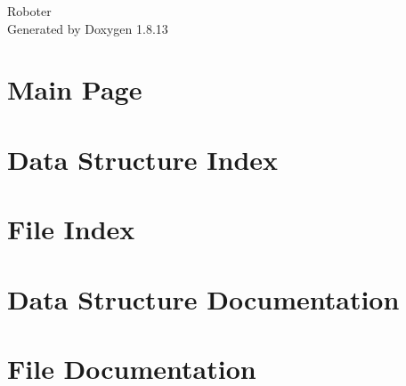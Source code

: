 \documentclass[twoside]{book}
\newcommand{\+}{\discretionary{\mbox{\scriptsize$\hookleftarrow$}}{}{}}
\newcommand{\clearemptydoublepage}{%
  \newpage{\pagestyle{empty}\cleardoublepage}%
}
\begin{document}
\hypersetup{pageanchor=false,
             bookmarksnumbered=true,
             pdfencoding=unicode
            }
\begin{titlepage}
\vspace*{7cm}
\begin{center}%
{\Large Roboter }\\
\vspace*{1cm}
{\large Generated by Doxygen 1.8.13}\\
\end{center}
\end{titlepage}
\clearemptydoublepage
{}
\tableofcontents
\clearemptydoublepage
{}
\hypersetup{pageanchor=true}

\chapter{Main Page}
\label{index}\hypertarget{index}{}
\chapter{Data Structure Index}

\chapter{File Index}

\chapter{Data Structure Documentation}



\chapter{File Documentation}























\backmatter
\newpage
{}
\clearemptydoublepage
{}
\printindex
\end{document}

